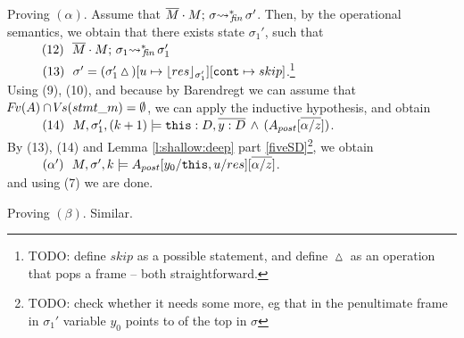 \begin{description}
 \vspace{.1cm}
Proving $(\alpha)$. Assume that   $\leadstoBoundedStarFin  {\Mtwo\cdot M}  {\sigma}  {\sigma'}$. Then, by the operational semantics, we obtain that 
there exists state $\sigma_1'$, such that \\
$\SPS (12) \ \ \leadstoBoundedStarFin  {\Mtwo\cdot M}  {\sigma_1}  {\sigma_1'}$ \\
$\SPS (13) \ \ \sigma'=(\sigma_1'\popSymbol)[u \mapsto {\interpret {\sigma_1'} {res}}][\prg{cont}\mapsto skip]$.\footnote{TODO: define $skip$ as a possible statement, and define $\popSymbol$ as an operation that pops a frame -- both straightforward.}
\\
Using (9), (10), and because by Barendregt we can assume that $\fv(A)\cap \vs(stmt\_m) = \emptyset$, we can apply the inductive hypothesis, and obtain\\
$\SPS (14) \ \  \satDAssertFrom M  {\sigma_1'} {(k+1)}   {\prg{this}:D,\overline{y:D}\, \wedge\, (A_{post}[\overline{\alpha/z}])}$.
\\
By (13), (14) and Lemma  \ref{l:shallow:deep} part \ref{fiveSD}\footnote{TODO: check whether it needs some more, eg that in the penultimate frame in $\sigma_1'$ variable $y_0$ points to  of the top in $\sigma$}, we obtain\\
$\SPS (\alpha') \ \  \satDAssertFrom M  {\sigma'} {k}   {A_{post}[y_0/ \prg{this},u/res][\overline{\alpha/z}]}$.\\
and using (7) we are done.

 \vspace{.1cm}
Proving $(\beta)$. Similar.


\end{description}
